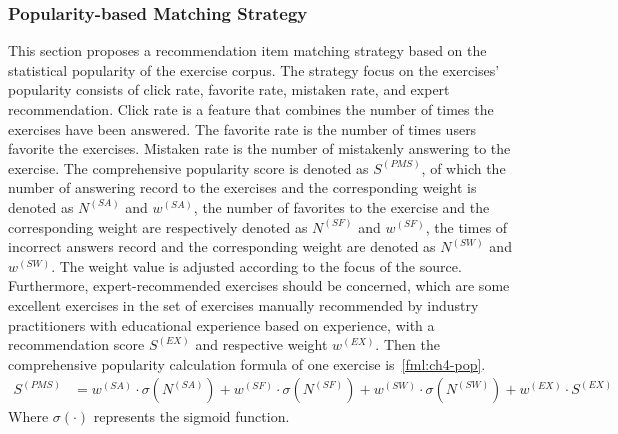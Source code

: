 \subsubsection{Popularity-based Matching Strategy}



This section proposes a recommendation item matching strategy based on the statistical popularity of the exercise corpus. The strategy focus on the exercises' popularity consists of click rate, favorite rate, mistaken rate, and expert recommendation. Click rate is a feature that combines the number of times the exercises have been answered. The favorite rate is the number of times users favorite the exercises. Mistaken rate is the number of mistakenly answering to the exercise. The comprehensive popularity score is denoted as \(S^{(PMS)}\), of which the number of answering record to the exercises and the corresponding weight is denoted as \(N^{(SA)}\) and \(w^{(SA)}\), the number of favorites to the exercise and the corresponding weight are respectively denoted as \(N^{(SF)}\) and \(w^{(SF)} \), the times of incorrect answers record and the corresponding weight are denoted as \(N^{(SW)}\) and \(w^{(SW)}\). The weight value is adjusted according to the focus of the source. Furthermore, expert-recommended exercises should be concerned, which are some excellent exercises in the set of exercises manually recommended by industry practitioners with educational experience based on experience, with a recommendation score \(S^{(EX)}\) and respective weight \(w^{(EX)}\). Then the comprehensive popularity calculation formula of one exercise is~\ref{fml:ch4-pop}.
\begin{align}
    S^{(PMS)} & = w^{(SA)}\cdot \sigma(N^{(SA)})+w^{(SF)}\cdot\sigma(N^{(SF)})+w^{(SW)}\cdot\sigma(N^{(SW)})+w^{(EX)}\cdot S^{(EX)}\label{fml:ch4-pop}
\end{align}
Where \(\sigma(\cdot)\) represents the sigmoid function.

